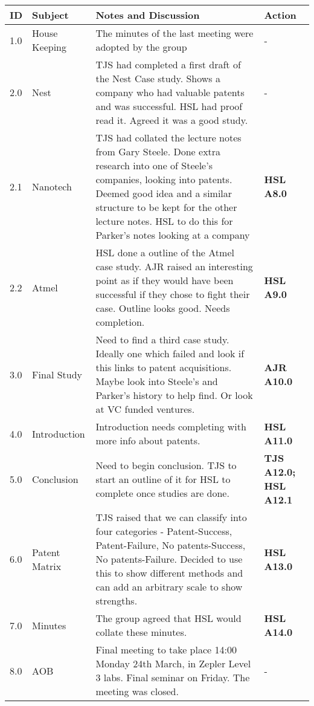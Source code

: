 \begin{center}
\begin{longtable}{| p{} |>{\raggedright\arraybackslash}p{} | p{} |>{\raggedright\arraybackslash}p{}|} \hline
\textbf{ID} & \textbf{Subject} & \textbf{Notes and Discussion} & \textbf{Action} \\ \hline
\endhead
1.0	&	House Keeping	&	The minutes of the last meeting were adopted by the group								&	- \\ \hline
2.0	&	Nest		&	TJS had completed a first draft of the Nest Case study. Shows a company who had valuable patents and was successful. HSL had proof read it. Agreed it was a good study.	&	- \\ \hline
2.1	&	Nanotech	&	TJS had collated the lecture notes from Gary Steele. Done extra research into one of Steele's companies, looking into patents. Deemed good idea and a similar structure to be kept for the other lecture notes.	HSL to do this for Parker's notes looking at a company	&	\textbf{HSL A8.0} \\ \hline
2.2	&	Atmel		&	HSL done a outline of the Atmel case study. AJR raised an interesting point as if they would have been successful if they chose to fight their case. Outline looks good. Needs completion. &	\textbf{ HSL A9.0} \\ \hline
3.0	&	Final Study	&	Need to find a third case study. Ideally one which failed and look if this links to patent acquisitions. Maybe look into Steele's and Parker's history to help find. Or look at VC funded ventures.  &	\textbf{AJR A10.0} \\ \hline
4.0	&	Introduction 	&	Introduction needs completing with more info about patents.						&	\textbf{HSL A11.0 } \\ \hline
5.0	&	Conclusion   	&	Need to begin conclusion. TJS to start an outline of it for HSL to complete once studies are done.	&	\textbf{TJS A12.0; HSL A12.1} \\ \hline
6.0	&	Patent Matrix	&	TJS raised that we can classify into four categories - Patent-Success, Patent-Failure, No patents-Success, No patents-Failure. Decided to use this to show different methods and can add an arbitrary scale to show strengths.			& \textbf{HSL A13.0} \\ \hline
7.0	&	Minutes		&	The group agreed that HSL would collate these minutes.			& \textbf{HSL A14.0} \\ \hline
8.0	&	AOB		&	Final meeting to take place 14:00 Monday 24th March, in Zepler Level 3 labs. Final seminar on Friday. The meeting was closed. & - \\ \hline

\end{longtable}
\end{center}

